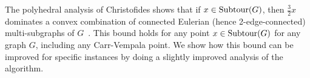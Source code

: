 The polyhedral analysis of Christofides shows that if $x\in \operatorname{{Subtour}}(G)$, then $\frac{3}{2}x$ dominates a convex combination of connected Eulerian (hence 2-edge-connected) multi-subgraphs of $G$~\cite{wolsey,shmoyswilliamson}. This bound holds for any point $x\in \operatorname{{Subtour}}(G)$ for any graph $G$, including any Carr-Vempala point. We show how this bound can be improved for specific instances by doing a slightly improved analysis of the algorithm.

